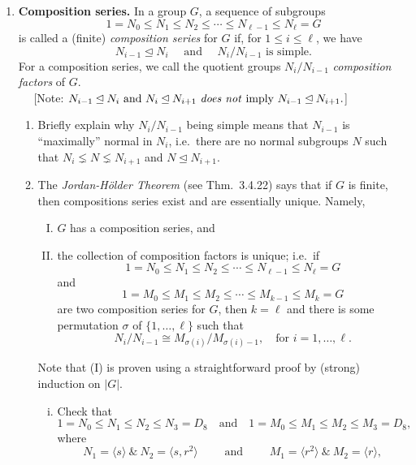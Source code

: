 \documentclass[11pt, reqno]{amsart}
\theoremstyle{plain}
\theoremstyle{definition}
\theoremstyle{example}
\def\<{\langle} \def\>{\rangle}
\def\normeq{\unlhd}
\begin{document}
\begin{enumerate}[1.]
\begin{enumerate}[(a)]
\end{enumerate}


\item {\bf Composition series.} In a group $G$, a sequence of subgroups 
$$1 = N_0 \leq N_1 \leq N_2 \leq \cdots \leq N_{\ell-1} \leq N_\ell = G$$
is called a (finite) \emph{composition series} for $G$ if, for $1 \leq i \leq \ell$, we have
$$N_{i-1} \normeq N_{i} \quad \text{ and } \quad N_{i}/N_{i-1} \text{ is simple.}$$
 For a composition series, we call the quotient groups $N_{i}/N_{i-1}$  \emph{composition factors} of $G$.\\$\quad$ \hfill{\footnotesize[Note:  
$N_{i-1} \normeq N_{i} \text{ and } N_i \normeq N_{i+1} \text{ \emph{does not} imply } N_{i-1} \normeq N_{i+1}.$]}
\begin{enumerate}
\item Briefly explain why $N_{i}/N_{i-1}$ being simple means that $N_{i-1}$ is ``maximally'' normal in $N_{i}$, i.e.\  there are no normal subgroups $N$ such that $N_{i} \lneq N \lneq N_{i+1}$ and $N \normeq N_{i+1}$. 
\item The \emph{Jordan-H\"{o}lder Theorem} (see Thm.\ 3.4.22) says that if $G$ is finite, then compositions series exist and are essentially unique. Namely,
\begin{enumerate}[(I)]
\item $G$ has a composition series, and 
\item the collection of composition factors is unique; i.e.\ if 
$$1 = N_0 \leq N_1 \leq N_2 \leq \cdots \leq N_{\ell-1} \leq N_\ell = G$$
and 
$$1 = M_0 \leq M_1 \leq M_2 \leq \cdots \leq M_{k-1} \leq M_k = G$$
are two composition series for $G$, then $k = \ell$ and there is some permutation $\sigma$ of $\{1, \dots, \ell\}$ such that 
$$N_i/ N_{i-1} \cong M_{\sigma(i)}/ M_{\sigma(i) - 1}, \quad \text{for } i = 1, \dots, \ell.$$
\end{enumerate}
Note that (I) is proven using a straightforward proof by (strong) induction on $|G|$. 
\begin{enumerate}[(i)]
\item Check that
$$1 = N_0 \leq N_1 \leq N_2 \leq N_3 = D_8 \quad \text{and} \quad 
	1 = M_0 \leq M_1 \leq M_2 \leq M_3 = D_8,$$
where 
$$N_1 = \<s\> \ \&\ N_2 = \<s, r^2\> \qquad \text{ and } \qquad M_1 = \<r^2\>  \ \&\ M_2 = \<r\>,$$

\end{enumerate}
\end{enumerate}
\end{enumerate}
\end{document}
